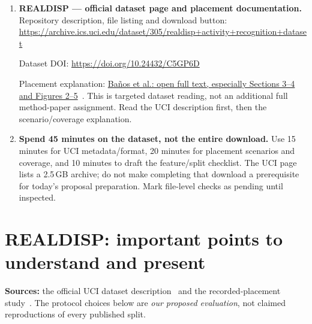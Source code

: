 \documentclass[10pt]{article}
\begin{document}
\begin{enumerate}[label=\textbf{\arabic*.},itemsep=7pt]
\item \textbf{REALDISP --- official dataset page and placement documentation.}\\
Repository description, file listing and download button:\\
\url{https://archive.ics.uci.edu/dataset/305/realdisp+activity+recognition+dataset}\par
Dataset DOI: \url{https://doi.org/10.24432/C5GP6D}\par
Placement explanation: \href{https://pmc.ncbi.nlm.nih.gov/articles/PMC4118358/}{Ba\~nos et al.: open full text, especially Sections 3--4 and Figures 2--5}~\cite{ombanos,omrealdisp}. This is targeted dataset reading, not an additional full method-paper assignment. Read the UCI description first, then the scenario/coverage explanation.

\item \textbf{Spend 45 minutes on the dataset, not the entire download.} Use 15 minutes for UCI metadata/format, 20 minutes for placement scenarios and coverage, and 10 minutes to draft the feature/split checklist. The UCI page lists a 2.5\,GB archive; do not make completing that download a prerequisite for today's proposal preparation. Mark file-level checks as pending until inspected.
\end{enumerate}

\clearpage
\section*{REALDISP: important points to understand and present}
\textbf{Sources:} the official UCI dataset description~\cite{omrealdisp} and the recorded-placement study~\cite{ombanos}. The protocol choices below are \emph{our proposed evaluation}, not claimed reproductions of every published split.
\end{document}
